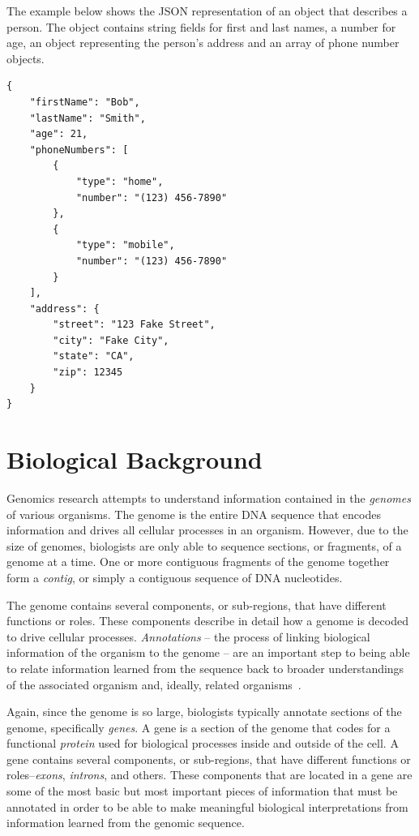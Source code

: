 \documentclass[12pt]{ucthesis}
\begin{document}
The example below shows the JSON representation of an object that describes a person. The object contains string fields for first  and last names, a number for age, an object representing the person's address and an array of phone number objects.

\begin{verbatim}
{
    "firstName": "Bob",
    "lastName": "Smith",
    "age": 21,
    "phoneNumbers": [
        {
            "type": "home",
            "number": "(123) 456-7890"
        },
        {
            "type": "mobile",
            "number": "(123) 456-7890"
        }
    ],
    "address": {
        "street": "123 Fake Street",
        "city": "Fake City",
        "state": "CA",
        "zip": 12345
    }
}
\end{verbatim}

\section{Biological Background}
\label{bio-background}
Genomics research attempts to understand information contained in the
\textit{genomes} of various organisms. The genome is the entire DNA sequence
that encodes information and drives all cellular processes in an organism.
However, due to the size of genomes, biologists are only able to sequence
sections, or fragments, of a genome at a time. One or more contiguous fragments
of the genome together form a \textit{contig}, or simply a contiguous sequence
of DNA nucleotides. 

The genome contains several components, or sub-regions,
that have different functions or roles. These components describe in detail how
a genome is decoded to drive cellular processes. \textit{Annotations} -- the
process of linking biological information of the organism to the genome -- are an
important step to being able to relate information learned from the sequence back
to broader understandings of the associated organism and, ideally, related
organisms~\cite{annotation}. 

Again, since the genome is so large, biologists
typically annotate sections of the genome, specifically \textit{genes}. A gene
is a section of the genome that codes for a functional \textit{protein} used
for biological processes inside and outside of the cell. A gene contains
several components, or sub-regions, that have different functions or
roles--\textit{exons}, \textit{introns}, and
others. These components that are located in a gene are some of the most basic but
most important pieces of information that must be annotated in order to be able
to make meaningful biological interpretations from information learned from the
genomic sequence.
\end{document}
